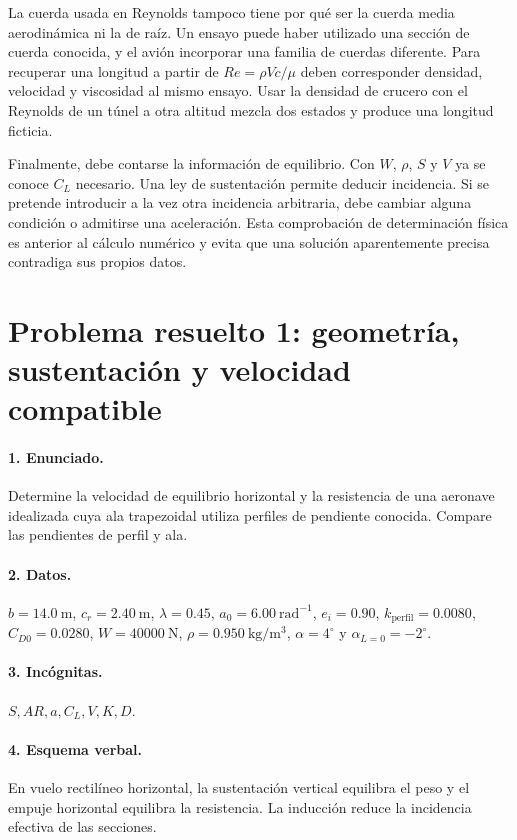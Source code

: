 La cuerda usada en Reynolds tampoco tiene por qué ser la cuerda media aerodinámica ni la de raíz. Un ensayo puede haber utilizado una sección de cuerda conocida, y el avión incorporar una familia de cuerdas diferente. Para recuperar una longitud a partir de $Re=\rho Vc/\mu$ deben corresponder densidad, velocidad y viscosidad al mismo ensayo. Usar la densidad de crucero con el Reynolds de un túnel a otra altitud mezcla dos estados y produce una longitud ficticia.

Finalmente, debe contarse la información de equilibrio. Con $W$, $\rho$, $S$ y $V$ ya se conoce $C_L$ necesario. Una ley de sustentación permite deducir incidencia. Si se pretende introducir a la vez otra incidencia arbitraria, debe cambiar alguna condición o admitirse una aceleración. Esta comprobación de determinación física es anterior al cálculo numérico y evita que una solución aparentemente precisa contradiga sus propios datos.

\section{Problema resuelto 1: geometría, sustentación y velocidad compatible}
\paragraph{1. Enunciado.} Determine la velocidad de equilibrio horizontal y la resistencia de una aeronave idealizada cuya ala trapezoidal utiliza perfiles de pendiente conocida. Compare las pendientes de perfil y ala.
\paragraph{2. Datos.} $b=14.0\ \mathrm m$, $c_r=2.40\ \mathrm m$, $\lambda=0.45$, $a_0=6.00\ \mathrm{rad^{-1}}$, $e_i=0.90$, $k_{\mathrm{perfil}}=0.0080$, $C_{D0}=0.0280$, $W=40000\ \mathrm N$, $\rho=0.950\ \mathrm{kg/m^3}$, $\alpha=4^\circ$ y $\alpha_{L=0}=-2^\circ$.
\paragraph{3. Incógnitas.} $S,AR,a,C_L,V,K,D$.
\paragraph{4. Esquema verbal.} En vuelo rectilíneo horizontal, la sustentación vertical equilibra el peso y el empuje horizontal equilibra la resistencia. La inducción reduce la incidencia efectiva de las secciones.

